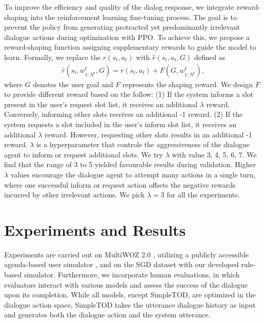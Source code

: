 \documentclass[letterpaper]{article} %
\begin{document}

To improve the efficiency and quality of the dialog response, we integrate reward-shaping into the reinforcement learning fine-tuning process. 
The goal is to prevent the policy from generating protracted yet predominantly irrelevant dialogue actions during optimization with PPO. 
To achieve this, we propose a reward-shaping function assigning supplementary rewards to guide the model to learn.
Formally, we replace the $r(s_t, a_t)$ with $\hat{r}(s_t,a_t, G)$ defined as
\begin{equation}
\begin{aligned}
    \hat{r}(s_t,w_{1:N^t}^t, G) = r(s_t, a_t) + F(G, w_{1:N^t}^t),
\end{aligned}
\end{equation}
where $G$ denotes the user goal and $F$ represents the shaping reward. We design $F$ to provide different reward based on the follow: 
(1) If the system informs a slot present in the user's request slot list, it receives an additional $\lambda$ reward. Conversely, informing other slots receives an additional -1 reward. (2) If the system requests a slot included in the user's inform slot list, it receives an additional $\lambda$ reward. However, requesting other slots results in an additional -1 reward. $\lambda$ is a hyperparameter that controls the aggressiveness of the dialogue agent to inform or request additional slots. We try $\lambda$ with value 3, 4, 5, 6, 7. We find that the range of 3 to 5 yielded favourable results during validation. 
Higher $\lambda$ values encourage the dialogue agent to attempt many actions in a single turn, where one successful inform or request action offsets the negative rewards incurred by other irrelevant actions. We pick $\lambda=3$ for all the experiments.


\section{Experiments and Results}
Experiments are carried out on MultiWOZ 2.0 \cite{budzianowski2018multiwoz}, utilizing a publicly accessible agenda-based user simulator \cite{zhu2020convlab}, and on the SGD dataset with our developed rule-based simulator. Furthermore, we incorporate human evaluations, in which evaluators interact with various models and assess the success of the dialogue upon its completion. While all models, except SimpleTOD, are optimized in the dialogue action space, SimpleTOD takes the utterance dialogue history as input and generates both the dialogue action and the system utterance.
\end{document}
